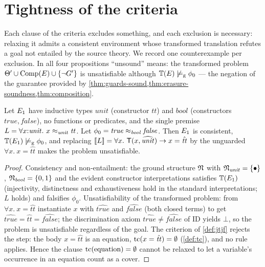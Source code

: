 \section{Tightness of the criteria}
\label{sec:tightness}

Each clause of the criteria excludes something, and each exclusion is
necessary: relaxing it admits a consistent environment whose transformed
translation refutes a goal not entailed by the source theory.  We record
one counterexample per exclusion.  In all four propositions ``unsound''
means: the transformed problem
$\Theta' \cup \mathrm{Comp}(E) \cup \{\neg G'\}$ is unsatisfiable although
$\mathbb{T}(E) \not\models_{\mathrm{g}} \phi_0$ --- the negation of the guarantee provided by
\cref{thm:guards-sound,thm:erasure-soundness,thm:composition}.

\begin{proposition}
  \label{prop:tight-uncovered}
  Let $E_1$ have inductive types $\mathit{unit}$ (constructor
  $\mathit{tt}$) and $\mathit{bool}$ (constructors
  $\mathit{true}, \mathit{false}$), no functions or predicates, and the
  single premise $L = \forall x{:}\mathit{unit}.\ x \approx_{\mathit{unit}}
  \mathit{tt}$.  Let $\phi_0 = \mathit{true} \approx_{\mathit{bool}}
  \mathit{false}$.  Then $E_1$ is consistent,
  $\mathbb{T}(E_1) \not\models_{\mathrm{g}} \phi_0$, and replacing $[\![ L ]\!] =
  \forall x.\ \mathsf{T}(x, \widehat{\mathit{unit}}) \rightarrow x = \hat{\mathit{tt}}$
  by the unguarded $\forall x.\ x = \hat{\mathit{tt}}$ makes the problem
  unsatisfiable.
\end{proposition}

\begin{proof}
  Consistency and non-entailment: the ground structure $\mathfrak{N}$ with
  $\mathfrak{N}_{\mathit{unit}} = \{\bullet\}$,
  $\mathfrak{N}_{\mathit{bool}} = \{0,1\}$ and the evident constructor
  interpretations satisfies $\mathbb{T}(E_1)$ (injectivity, distinctness
  and exhaustiveness hold in the standard interpretations; $L$ holds) and
  falsifies $\phi_0$.  Unsatisfiability of the transformed problem: from
  $\forall x.\ x = \hat{\mathit{tt}}$ instantiate $x$ with
  $\hat{\mathit{true}}$ and $\hat{\mathit{false}}$ (both closed terms) to
  get $\hat{\mathit{true}} = \hat{\mathit{tt}} =
  \hat{\mathit{false}}$; the discrimination axiom
  $\hat{\mathit{true}} \neq \hat{\mathit{false}}$ of $\mathrm{ID}$
  yields $\bot$, so the problem is unsatisfiable regardless of the goal.
  The criterion of \cref{def:jtjf} rejects the step: the body
  $x = \hat{\mathit{tt}}$ is an equation, $\mathrm{tc}(x = \hat{\mathit{tt}}) =
  \emptyset$ (\cref{def:tc}), and no rule applies.  Hence the clause
  $\mathrm{tc}(\text{equation}) = \emptyset$ cannot be relaxed to let a variable's
  occurrence in an equation count as a cover.
\end{proof}

